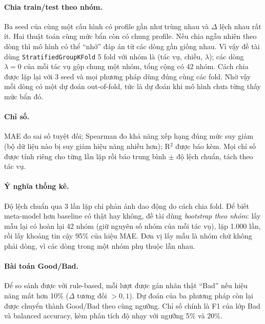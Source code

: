 \paragraph{Chia train/test theo nhóm.} Ba seed của cùng một cấu hình có profile gần như trùng nhau và $\Delta$ lệch nhau rất ít. Hai thuật toán cùng mức bẩn còn có chung profile. Nếu chia ngẫu nhiên theo dòng thì mô hình có thể ``nhớ'' đáp án từ các dòng gần giống nhau. Vì vậy đề tài dùng \texttt{StratifiedGroupKFold} 5 fold với nhóm là (tác vụ, chiều, $\lambda$); các dòng $\lambda = 0$ của mỗi tác vụ gộp chung một nhóm, tổng cộng có 42 nhóm. Cách chia được lặp lại với 3 seed và mọi phương pháp dùng đúng cùng các fold. Nhờ vậy mỗi dòng có một dự đoán out-of-fold, tức là dự đoán khi mô hình chưa từng thấy mức bẩn đó.

\paragraph{Chỉ số.} MAE đo sai số tuyệt đối; Spearman đo khả năng xếp hạng đúng mức suy giảm (bộ dữ liệu nào bị suy giảm hiệu năng nhiều hơn); R$^2$ được báo kèm. Mọi chỉ số được tính riêng cho từng lần lặp rồi báo trung bình $\pm$ độ lệch chuẩn, tách theo tác vụ.

\paragraph{Ý nghĩa thống kê.} Độ lệch chuẩn qua 3 lần lặp chỉ phản ánh dao động do cách chia fold. Để biết meta-model hơn baseline có thật hay không, đề tài dùng \emph{bootstrap theo nhóm}: lấy mẫu lại có hoàn lại 42 nhóm (giữ nguyên số nhóm của mỗi tác vụ), lặp 1.000 lần, rồi lấy khoảng tin cậy 95\% của hiệu MAE. Đơn vị lấy mẫu là nhóm chứ không phải dòng, vì các dòng trong một nhóm phụ thuộc lẫn nhau.

\paragraph{Bài toán Good/Bad.} Để so sánh được với rule-based, mỗi lượt được gán nhãn thật ``Bad'' nếu hiệu năng mất hơn 10\% ($\Delta$ tương đối $> 0{,}1$). Dự đoán của ba phương pháp còn lại được chuyển thành Good/Bad theo cùng ngưỡng. Chỉ số chính là F1 của lớp Bad và balanced accuracy, kèm phân tích độ nhạy với ngưỡng 5\% và 20\%.
